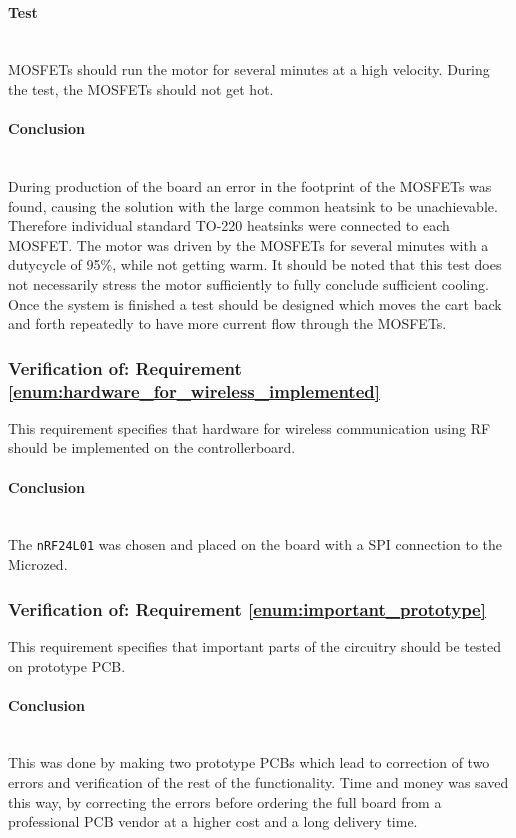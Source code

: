 \paragraph{Test}~\\
MOSFETs should run the motor for several minutes at a high velocity. 
During the test, the MOSFETs should not get hot.

\paragraph{Conclusion}~\\
During production of the board an error in the footprint of the MOSFETs was found, causing the solution with the large common heatsink to be unachievable.
Therefore individual standard TO-220 heatsinks were connected to each MOSFET.
The motor was driven by the MOSFETs for several minutes with a dutycycle of 95\%, while not getting warm.
It should be noted that this test does not necessarily stress the motor sufficiently to fully conclude sufficient cooling.
Once the system is finished a test should be designed which moves the cart back and  forth repeatedly to have more current flow through the MOSFETs.

\subsubsection{Verification of: Requirement \ref{enum:hardware_for_wireless_implemented}} %
\label{ssub:requirement_enum:hardware_for_wireless_implemented}
This requirement specifies that hardware for wireless communication using RF should be implemented on the controllerboard.

\paragraph{Conclusion}~\\
The \texttt{nRF24L01} was chosen and placed on the board with a SPI connection to the Microzed.

\subsubsection{Verification of: Requirement \ref{enum:important_prototype}} %
\label{ssub:requirement_enum:important_prototype}
This requirement specifies that important parts of the circuitry should be tested on prototype PCB.
\paragraph{Conclusion}~\\
This was done by making two prototype PCBs which lead to correction of two errors and verification of the rest of the functionality.
Time and money was saved this way, by correcting the errors before ordering the full board from a professional PCB vendor at a higher cost and a long delivery time.


